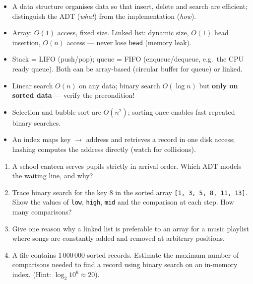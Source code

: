 \documentclass[11pt]{article}
\begin{document}
\begin{aretenir}
\begin{itemize}
\item A data structure organises data so that insert, delete and search are efficient; distinguish the ADT (\emph{what}) from the implementation (\emph{how}).
\item Array: $O(1)$ access, fixed size. Linked list: dynamic size, $O(1)$ head insertion, $O(n)$ access — never lose \texttt{head} (memory leak).
\item Stack = LIFO (push/pop); queue = FIFO (enqueue/dequeue, e.g.\ the CPU ready queue). Both can be array-based (circular buffer for queue) or linked.
\item Linear search $O(n)$ on any data; binary search $O(\log n)$ but \textbf{only on sorted data} — verify the precondition!
\item Selection and bubble sort are $O(n^2)$; sorting once enables fast repeated binary searches.
\item An index maps key $\to$ address and retrieves a record in one disk access; hashing computes the address directly (watch for collisions).
\end{itemize}
\end{aretenir}

\begin{exercice}
\begin{enumerate}
\item A school canteen serves pupils strictly in arrival order. Which ADT models the waiting line, and why?
\item Trace binary search for the key 8 in the sorted array \texttt{[1, 3, 5, 8, 11, 13]}. Show the values of \texttt{low}, \texttt{high}, \texttt{mid} and the comparison at each step. How many comparisons?
\item Give one reason why a linked list is preferable to an array for a music playlist where songs are constantly added and removed at arbitrary positions.
\item A file contains 1\,000\,000 sorted records. Estimate the maximum number of comparisons needed to find a record using binary search on an in-memory index. (Hint: $\log_2 10^6 \approx 20$).
\end{enumerate}
\end{exercice}
\end{document}
